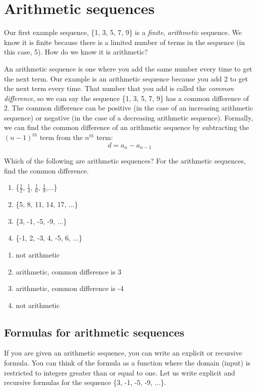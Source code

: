 \section{Arithmetic sequences}

Our first example sequence, \{1, 3, 5, 7, 9\} is a \textit{finite}, 
\textit{arithmetic} sequence. We know it is finite because there is a 
limited number of terms in the sequence (in this case, 5). How do we 
know it is arithmetic?

An arithmetic sequence is one where you add the same number every 
time to get the next term. Our example is an arithmetic sequence 
because you add 2 to get the next term every time. That number that 
you add is called the \textit{common difference}, so we can say the 
sequence \{1, 3, 5, 7, 9\} has a common difference of 2. The common 
difference can be positive (in the case of an increasing arithmetic 
sequence) or negative (in the case of a decreasing arithmetic 
sequence). Formally, we can find the common difference of an 
arithmetic sequence by subtracting the $(n-1)^{th}$ term from the 
$n^{th}$ term: 
$$d = a_n - a_{n-1}$$

\begin{Exercise}[label = seq1]
Which of the following are arithmetic sequences? For the arithmetic 
sequences, find the common difference.
\begin{enumerate}
\item \{$\frac{1}{2}$, $\frac{1}{4}$, $\frac{1}{6}$, $\frac{1}{8}$,...\}
\item \{5, 8, 11, 14, 17, ...\}
\item \{3, -1, -5, -9, ...\}
\item \{-1, 2, -3, 4, -5, 6, ...\}
\end{enumerate}
\end{Exercise}

\begin{Answer}[ref=seq1]
\begin{enumerate}
\item not arithmetic
\item arithmetic, common difference is 3
\item arithmetic, common difference is -4
\item not arithmetic
\end{enumerate}
\end{Answer}


\subsection{Formulas for arithmetic sequences}
If you are given an arithmetic sequence, you can write an explicit or 
recursive formula. You can think of the formula as a function where 
the domain (input) is restricted to integers greater than or equal to 
one. Let us write explicit and recursive formulas for the sequence 
\{3, -1, -5, -9, ...\}. 

